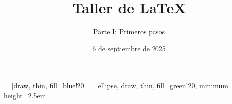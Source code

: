 
\title{Taller de \LaTeX}
\subtitle{Parte I: Primeros pasos}
\date{6 de septiembre de 2025}
\usetikzlibrary{arrows,shapes}
 = [draw, thin, fill=blue!20]
 = [ellipse, draw, thin, fill=green!20, minimum height=2.5em]












